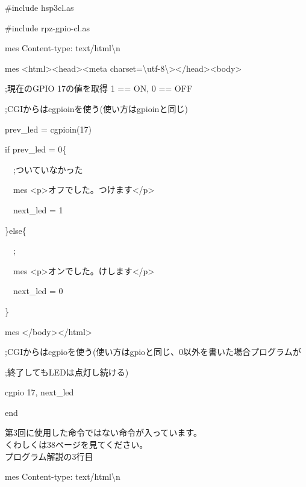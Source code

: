 \documentclass[a4paper,12pt,dvipdfmx]{jarticle}
\begin{document}
\centering
\begin{boxedminipage}{0.95\textwidth}
	\#include {\textquotedbl}hsp3cl.as{\textquotedbl}

	\#include {\textquotedbl}rpz-gpio-cl.as{\textquotedbl}


	\bigskip

	mes {\textquotedbl}Content-type: text/html{\textbackslash}n{\textquotedbl}

	mes {\textquotedbl}{\textless}html{\textgreater}{\textless}head{\textgreater}{\textless}meta
	charset={\textbackslash}{\textquotedbl}utf-8{\textbackslash}{\textquotedbl}{\textgreater}{\textless}/head{\textgreater}{\textless}body{\textgreater}{\textquotedbl}


	\bigskip

	;現在のGPIO 17の値を取得 1 == ON, 0 == OFF

	;CGIからはcgpioinを使う(使い方はgpioinと同じ)

	prev\_led = cgpioin(17)

	\bigskip

	if prev\_led = 0\{

	\ \ ;ついていなかった

	\ \ mes
		{\textquotedbl}{\textless}p{\textgreater}オフでした。つけます{\textless}/p{\textgreater}{\textquotedbl}

	\ \ next\_led = 1

	\}else\{

	\ \ ;

	\ \ mes
		{\textquotedbl}{\textless}p{\textgreater}オンでした。けします{\textless}/p{\textgreater}{\textquotedbl}

	\ \ next\_led = 0

	\}

	mes {\textquotedbl}{\textless}/body{\textgreater}{\textless}/html{\textgreater}{\textquotedbl}

	;CGIからはcgpioを使う(使い方はgpioと同じ、0以外を書いた場合プログラムが

	;終了してもLEDは点灯し続ける)

	cgpio 17, next\_led

	end
\end{boxedminipage}
\flushleft


第3回に使用した命令ではない命令が入っています。\\
くわしくは38ページを見てください。\\

プログラム解説の3行目

mes {\textquotedbl}Content-type: text/html{\textbackslash}n{\textquotedbl}
\end{document}
